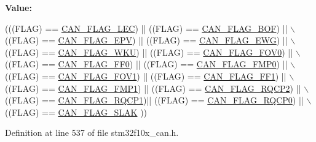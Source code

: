 {\bfseries Value\+:}
\begin{DoxyCode}
(((FLAG) == \hyperlink{group___c_a_n__flags_ga73a774fa4d391aec0ea6552bf9372917}{CAN\_FLAG\_LEC})  || ((FLAG) == \hyperlink{group___c_a_n__flags_ga65f20612d0bf1692003882c0cdbadb1c}{CAN\_FLAG\_BOF})   || \(\backslash\)
                               ((FLAG) == \hyperlink{group___c_a_n__flags_ga61954e54995f638ed78281ad2b0cf43a}{CAN\_FLAG\_EPV})  || ((FLAG) == 
      \hyperlink{group___c_a_n__flags_gae8906ba9c4031866c5096418ffa9bf71}{CAN\_FLAG\_EWG})   || \(\backslash\)
                               ((FLAG) == \hyperlink{group___c_a_n__flags_ga18c72dbe75cb80e8b5126c23c9120818}{CAN\_FLAG\_WKU})  || ((FLAG) == 
      \hyperlink{group___c_a_n__flags_ga2abd66b5e0032132673208decd2d01f2}{CAN\_FLAG\_FOV0})  || \(\backslash\)
                               ((FLAG) == \hyperlink{group___c_a_n__flags_ga11648741ff43af1561ce7009698fb797}{CAN\_FLAG\_FF0})  || ((FLAG) == 
      \hyperlink{group___c_a_n__flags_ga4b40574700edfe752433bb4e0d457c64}{CAN\_FLAG\_FMP0})  || \(\backslash\)
                               ((FLAG) == \hyperlink{group___c_a_n__flags_gac1af6e61b1285ddc4658c4bcc152719a}{CAN\_FLAG\_FOV1}) || ((FLAG) == 
      \hyperlink{group___c_a_n__flags_ga0fa967743c5db04189bb2160aa48e371}{CAN\_FLAG\_FF1})   || \(\backslash\)
                               ((FLAG) == \hyperlink{group___c_a_n__flags_ga5d4b7376954a059fbd74ed8d688f6657}{CAN\_FLAG\_FMP1}) || ((FLAG) == 
      \hyperlink{group___c_a_n__flags_ga9c20cd47e558135bd7ae71149583d487}{CAN\_FLAG\_RQCP2}) || \(\backslash\)
                               ((FLAG) == \hyperlink{group___c_a_n__flags_gaba705586ebc3d961507436c03a2feaba}{CAN\_FLAG\_RQCP1})|| ((FLAG) == 
      \hyperlink{group___c_a_n__flags_ga6df0579049eb471720ea103c5446298b}{CAN\_FLAG\_RQCP0}) || \(\backslash\)
                               ((FLAG) == \hyperlink{group___c_a_n__flags_gad087b5025a3d5ead2c32b06663821cf4}{CAN\_FLAG\_SLAK} ))
\end{DoxyCode}


Definition at line 537 of file stm32f10x\+\_\+can.\+h.

